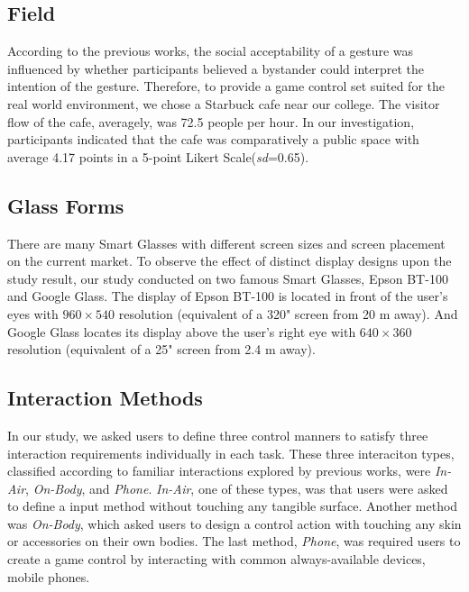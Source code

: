 \documentclass{sigchi}
\begin{document}
  \subsection {Field}
  According to the previous works\cite{Wiliamson:2011:MMI:2070481.2070551,Williamson:2013:MEM:2522848.2522874,Montero:2010:YUS:1851600.1851647,Rico:2010:UGM:1753326.1753458}, the social acceptability of a gesture was influenced by whether participants believed a bystander could interpret the intention of the gesture. Therefore, to provide a game control set suited for the real world environment, we chose a Starbuck cafe near our college. The visitor flow of the cafe, averagely, was 72.5 people per hour. In our investigation, participants indicated that the cafe was comparatively a public space with average 4.17 points in a 5-point Likert Scale(\textsl{sd}=0.65).    

  \subsection {Glass Forms}
  There are many Smart Glasses with different screen sizes and screen placement on the current market. To observe the effect of distinct display designs upon the study result, our study conducted on two famous Smart Glasses, Epson BT-100 and Google Glass. The display of Epson BT-100 is located in front of the user's eyes with $960 \times 540$ resolution (equivalent of a 320" screen from 20 m away)\cite{BT100}. And Google Glass locates its display above the user's right eye with $640 \times 360$ resolution (equivalent of a 25" screen from 2.4 m away)\cite{GoogleGlass}.       

    \subsection {Interaction Methods}
    In our study, we asked users to define three control manners to satisfy three interaction requirements individually in each task. These three interaciton types, classified according to familiar interactions explored by previous works, were \textsl{In-Air}, \textsl{On-Body}, and \textsl{Phone}. \textsl{In-Air}, one of these types, was that users were asked to define a input method without touching any tangible surface. Another method was \textsl{On-Body}, which asked users to design a control action with touching any skin or accessories on their own bodies. The last method, \textsl{Phone}, was required users to create a game control by interacting with common always-available devices, mobile phones.    
\end{document}
